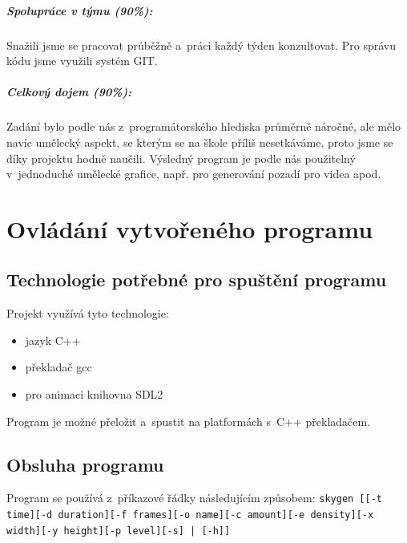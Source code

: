 \documentclass[12pt,a4paper,titlepage,final]{report}
\begin{document}
\paragraph{Spolupráce v týmu (90\%):}
Snažili jsme se pracovat průběžně a~práci každý týden konzultovat. Pro
správu kódu jsme využili systém GIT.

\paragraph{Celkový dojem (90\%):}
Zadání bylo podle nás z~programátorského hlediska průměrně náročné, ale
mělo navíc umělecký aspekt, se kterým se na škole příliš nesetkáváme,
proto jsme se díky projektu hodně naučili. Výsledný program je podle
nás použitelný v~jednoduché umělecké grafice, např. pro generování pozadí
pro videa apod.

\chapter{Ovládání vytvořeného programu}

\section{Technologie potřebné pro spuštění programu}
Projekt využívá tyto technologie:

\begin{itemize}
\item jazyk C++
\item překladač gcc
\item pro animaci knihovna SDL2
\end{itemize}

Program je možné přeložit a~spustit na platformách s~C++ překladačem.

\section{Obsluha programu}

Program se používá z~příkazové řádky následujícím způsobem:
{\tt skygen [[-t time][-d duration][-f frames][-o name][-c amount][-e density][-x width][-y height][-p level][-s] | [-h]]}
\end{document}
